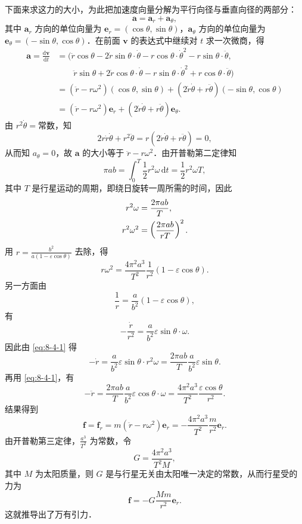 下面来求这力的大小，为此把加速度向量分解为平行向径与垂直向径的两部分：
\[
\boldsymbol{a} = \boldsymbol{a}_r + \boldsymbol{a}_\theta,
\]
其中 $\boldsymbol{a}_r$ 方向的单位向量为 $\boldsymbol{e}_r = (\cos\theta, \sin\theta)$，$\boldsymbol{a}_\theta$ 方向的单位向量为 $\boldsymbol{e}_\theta = (-\sin\theta, \cos\theta)$．在前面 $\boldsymbol{v}$ 的表达式中继续对 $t$ 求一次微商，得
\begin{align*}
\boldsymbol{a} = \frac{\mathrm{d}\boldsymbol{v}}{\mathrm{d}t} &= \big(\ddot{r}\cos\theta - 2\dot{r}\sin\theta\cdot\dot{\theta} - r\cos\theta\cdot\dot{\theta}^2 - r\sin\theta\cdot\ddot{\theta}, \\
&\qquad \ddot{r}\sin\theta + 2\dot{r}\cos\theta\cdot\dot{\theta} - r\sin\theta\cdot\dot{\theta}^2 + r\cos\theta\cdot\ddot{\theta}\big) \\
&= (\ddot{r} - r\omega^2)(\cos\theta, \sin\theta) + (2\dot{r}\dot{\theta} + r\ddot{\theta})(-\sin\theta, \cos\theta) \\
&= (\ddot{r} - r\omega^2)\boldsymbol{e}_r + (2\dot{r}\dot{\theta} + r\ddot{\theta})\boldsymbol{e}_\theta.
\end{align*}
由 $r^2\dot{\theta} = \text{常数}$，知
\[
2r\dot{r}\dot{\theta} + r^2\ddot{\theta} = r(2\dot{r}\dot{\theta} + r\ddot{\theta}) = 0,
\]
从而知 $a_\theta = 0$，故 $\boldsymbol{a}$ 的大小等于 $\ddot{r} - r\omega^2$．由开普勒第二定律知
\[
\pi a b = \int_0^T \frac{1}{2}r^2\omega\,\mathrm{d}t = \frac{1}{2}r^2\omega T,
\]
其中 $T$ 是行星运动的周期，即绕日旋转一周所需的时间，因此
\begin{align}
r^2\omega &= \frac{2\pi a b}{T}, \label{eq:8-4-1}\\
r^2\omega^2 &= \left(\frac{2\pi a b}{r T}\right)^2. \notag
\end{align}
用 $r = \frac{b^2}{a(1-\varepsilon\cos\theta)}$ 去除，得
\[
r\omega^2 = \frac{4\pi^2 a^3}{T^2}\frac{1}{r^2}(1-\varepsilon\cos\theta).
\]
另一方面由
\[
\frac{1}{r} = \frac{a}{b^2}(1-\varepsilon\cos\theta),
\]
有
\[
-\frac{\dot{r}}{r^2} = \frac{a}{b^2}\varepsilon\sin\theta\cdot\omega.
\]
因此由 \eqref{eq:8-4-1} 得
\[
-\dot{r} = \frac{a}{b^2}\varepsilon\sin\theta\cdot r^2\omega = \frac{2\pi a b}{T}\frac{a}{b^2}\varepsilon\sin\theta.
\]
再用 \eqref{eq:8-4-1}，有
\[
-\ddot{r} = \frac{2\pi a b}{T}\frac{a}{b^2}\varepsilon\cos\theta\cdot\omega = \frac{4\pi^2 a^3}{T^2}\frac{\varepsilon\cos\theta}{r^2}.
\]
结果得到
\[
\boldsymbol{f} = \boldsymbol{f}_r = m(\ddot{r} - r\omega^2)\boldsymbol{e}_r = -\frac{4\pi^2 a^3}{T^2}\frac{m}{r^2}\boldsymbol{e}_r.
\]
由开普勒第三定律，$\frac{a^3}{T^2}$ 为常数，令
\[
G = \frac{4\pi^2 a^3}{T^2 M},
\]
其中 $M$ 为太阳质量，则 $G$ 是与行星无关由太阳唯一决定的常数，从而行星受的力为
\[
\boldsymbol{f} = -G\frac{M m}{r^2}\boldsymbol{e}_r.
\]
这就推导出了万有引力．

